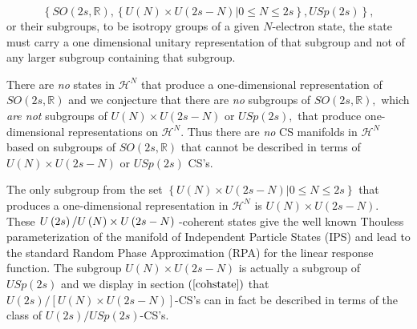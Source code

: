 \documentclass[12pt,aps,amsfonts,amssymb,tightenlines]{revtex4}%
\begin{document}
\begin{equation}
\left\{  SO\left(  2s,\mathbb{R}\right)  ,\left\{  \left.  U\left(  N\right)
\times U\left(  2s-N\right)  \right\vert 0\leq N\leq2s\right\}  ,USp\left(
2s\right)  \right\}  ,
\end{equation}
or their subgroups, to be isotropy groups of a given $N$-electron state, the
state must carry a one dimensional unitary representation of that subgroup and
not of any larger subgroup containing that subgroup.

There are \emph{no} states in $\mathcal{H}^{N}$ that produce a one-dimensional
representation of $SO\left(  2s,\mathbb{R}\right)  $ and we conjecture that
there are \emph{no }subgroups of $SO\left(  2s,\mathbb{R}\right)  ,$ which
\emph{are not} subgroups of $U\left(  N\right)  \times U\left(  2s-N\right)  $
or $USp\left(  2s\right)  ,$ that produce one-dimensional representations on
$\mathcal{H}^{N}$. Thus there are \emph{no }CS manifolds in $\mathcal{H}^{N}$
based on subgroups of $SO\left(  2s,\mathbb{R}\right)  $ that cannot be
described in terms of $U\left(  N\right)  \times U\left(  2s-N\right)  $ or
$USp\left(  2s\right)  $ CS's.

The only subgroup from the set $\left\{  \left.  U\left(  N\right)  \times
U\left(  2s-N\right)  \right\vert 0\leq N\leq2s\right\}  $ that produces a
one-dimensional representation in $\mathcal{H}^{N}$ is $U\left(  N\right)
\times U\left(  2s-N\right)  .$ These $U\left(  2s\right)  \left/  U\left(
N\right)  \times U\left(  2s-N\right)  \overset{}{}\right.  $-coherent states
give the well known Thouless parameterization \cite{Thouless60} of the
manifold of Independent Particle States (IPS) and lead to the standard Random
Phase Approximation (RPA) for the linear response function. The subgroup
$U\left(  N\right)  \times U\left(  2s-N\right)  $ is actually a subgroup of
$USp\left(  2s\right)  $ and we display in section $\left(  \ref{cohstate}%
\right)  $ that $U\left(  2s\right)  /\left[  U\left(  N\right)  \times
U\left(  2s-N\right)  \right]  $-CS's can in fact be described in terms of the
class of $U\left(  2s\right)  /USp\left(  2s\right)  $-CS's.
\end{document}
